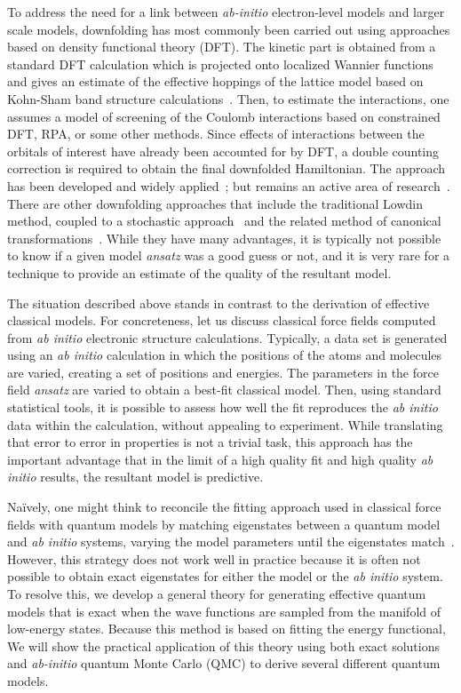 To address the need for a link between {\it ab-initio} electron-level models and larger scale models, downfolding has most commonly been carried out using approaches based on density functional theory (DFT). 
The kinetic part is obtained from a standard DFT calculation which is projected onto localized Wannier functions and gives an estimate of the effective hoppings of the lattice model based on Kohn-Sham band structure calculations~\cite{Pavirini}. 
Then, to estimate the interactions, one assumes a model of screening of the Coulomb interactions based on constrained DFT, RPA, or some other methods. 
Since effects of interactions between the orbitals of interest have already been accounted for by DFT, a double counting correction is required to obtain the final downfolded Hamiltonian. 
The approach has been developed and widely applied~\cite{Pavirini, Dasgupta, Aryasetiawan2004, Jeschke2013}; but remains an active area of research~\cite{Haule_doublecounting}.
There are other downfolding approaches that include the traditional Lowdin method, coupled to a stochastic approach~\cite{Tenno,Zhou_Ceperley} and the related method of canonical transformations~\cite{White_CT, Yanai_CT}. 
While they have many advantages, it is typically not possible to know if a given model {\it ansatz} was a good guess or not, and it is very rare for a technique to provide an estimate of the quality of the resultant model. 

The situation described above stands in contrast to the derivation of effective classical models. 
For concreteness, let us discuss classical force fields computed from {\it ab initio} electronic structure calculations. 
Typically, a data set is generated using an {\it ab initio} calculation in which the positions of the atoms and molecules are varied, creating a set of positions and energies. 
The parameters in the force field {\it ansatz} are varied to obtain a best-fit classical model.
Then, using standard statistical tools, it is possible to assess how well the fit reproduces the {\it ab initio} data within the calculation, without appealing to experiment. 
While translating that error to error in properties is not a trivial task, this approach has the important advantage that in the limit of a high quality fit and high quality {\it ab initio} results, the resultant model is predictive.

Na\"ively, one might think to reconcile the fitting approach used in classical force fields with quantum models by matching eigenstates between a quantum model and {\it ab initio} systems, varying the model parameters until the eigenstates match~\cite{Wagner2013}. 
However, this strategy does not work well in practice because it is often not possible to obtain exact eigenstates for either the model or the {\it ab initio} system.
To resolve this, we develop a general theory for generating effective quantum models that is exact when the wave functions are sampled from the manifold of low-energy states. 
Because this method is based on fitting the energy functional, 
We will show the practical application of this theory using both exact solutions and {\it ab-initio} quantum Monte Carlo (QMC) to derive several different quantum models.


